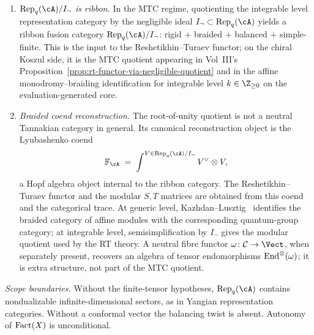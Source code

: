 \begin{remark}
\begin{enumerate}[label=\textup{(\alph*)}]
 semisimplicity, and non-degeneracy of the $S$-matrix.
\item \emph{$\Repq(\cA)/I_{\neg}$ is ribbon.} In the MTC regime,
 quotienting the integrable level representation category by the
 negligible ideal $I_{\neg} \subset \Repq(\cA)$ yields a ribbon
 fusion category $\Repq(\cA)/I_{\neg}$: rigid $+$ braided $+$
 balanced $+$ simple-finite. This is the input to the
 Reshetikhin--Turaev functor; on the chiral Koszul side, it is the
 MTC quotient appearing in
 Vol~III's Proposition~\ref{prop:rt-functor-via-negligible-quotient}
 and in the affine monodromy--braiding identification for
 integrable level $k \in \Z_{\geq 0}$ on the
 evaluation-generated core.
\item \emph{Braided coend reconstruction.} The root-of-unity quotient
 is not a neutral Tannakian category in general. Its canonical
 reconstruction object is the Lyubashenko coend
 \[
 \mathbb{F}_{\cA}
 \;=\;
 \int^{V\in \Repq(\cA)/I_{\neg}} V^\vee\otimes V,
 \]
 a Hopf algebra object internal to the ribbon category. The
 Reshetikhin--Turaev functor and the modular $S,T$ matrices are
 obtained from this coend and the categorical trace. At generic level,
 Kazhdan--Lusztig~\cite{KL93} identifies the braided category of
 affine modules with the corresponding quantum-group category; at
 integrable level, semisimplification by $I_{\neg}$ gives the
 modular quotient used by the RT theory. A neutral fibre functor
 $\omega\colon\mathcal C\to\Vect$, when separately present, recovers
 an algebra of tensor endomorphisms $\mathrm{End}^\otimes(\omega)$; it is
 extra structure, not part of the MTC quotient.
\end{enumerate}
\emph{Scope boundaries.} Without the finite-tensor hypotheses,
$\Repq(\cA)$ contains nondualizable infinite-dimensional sectors, as
in Yangian representation categories. Without a conformal vector the
balancing twist is absent. Autonomy of $\mathrm{Fact}(X)$ is unconditional.
\end{remark}

